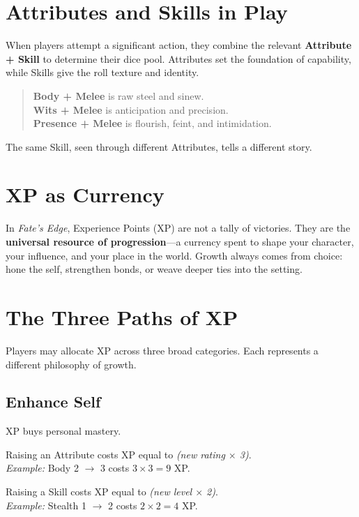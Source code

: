 \documentclass[12pt]{book}
\begin{document}
\section{Attributes and Skills in Play}
When players attempt a significant action, they combine the relevant \textbf{Attribute + Skill} to determine their dice pool. Attributes set the foundation of capability, while Skills give the roll texture and identity.
\begin{quote}
\textbf{Body + Melee} is raw steel and sinew.\\
\textbf{Wits + Melee} is anticipation and precision.\\
\textbf{Presence + Melee} is flourish, feint, and intimidation.
\end{quote}
The same Skill, seen through different Attributes, tells a different story.

\section{XP as Currency}
In \textit{Fate’s Edge}, Experience Points (XP) are not a tally of victories. They are the \textbf{universal resource of progression}—a currency spent to shape your character, your influence, and your place in the world. Growth always comes from choice: hone the self, strengthen bonds, or weave deeper ties into the setting.

\section{The Three Paths of XP}
Players may allocate XP across three broad categories. Each represents a different philosophy of growth.

\subsection{Enhance Self}
XP buys personal mastery.
\begin{description}[leftmargin=2cm]
  \item[Attributes] Raising an Attribute costs XP equal to \emph{(new rating $\times$ 3)}.\\
  \emph{Example:} Body 2 $\rightarrow$ 3 costs $3\times 3=9$ XP.
  \item[Skills] Raising a Skill costs XP equal to \emph{(new level $\times$ 2)}.\\
  \emph{Example:} Stealth 1 $\rightarrow$ 2 costs $2\times 2=4$ XP.
\end{description}
\end{document}
